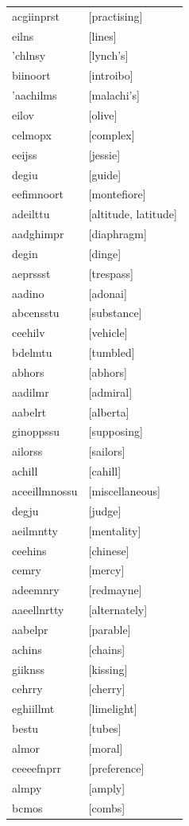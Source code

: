 \documentclass{article}
\begin{document}
\begin{tabular}{ll}
acgiinprst & [practising] \\
eilns & [lines] \\
'chlnsy & [lynch's] \\
biinoort & [introibo] \\
'aachilms & [malachi's] \\
eilov & [olive] \\
celmopx & [complex] \\
eeijss & [jessie] \\
degiu & [guide] \\
eefimnoort & [montefiore] \\
adeilttu & [altitude, latitude] \\
aadghimpr & [diaphragm] \\
degin & [dinge] \\
aeprssst & [trespass] \\
aadino & [adonai] \\
abcensstu & [substance] \\
ceehilv & [vehicle] \\
bdelmtu & [tumbled] \\
abhors & [abhors] \\
aadilmr & [admiral] \\
aabelrt & [alberta] \\
ginoppssu & [supposing] \\
ailorss & [sailors] \\
achill & [cahill] \\
aceeillmnossu & [miscellaneous] \\
degju & [judge] \\
aeilmntty & [mentality] \\
ceehins & [chinese] \\
cemry & [mercy] \\
adeemnry & [redmayne] \\
aaeellnrtty & [alternately] \\
aabelpr & [parable] \\
achins & [chains] \\
giiknss & [kissing] \\
cehrry & [cherry] \\
eghiillmt & [limelight] \\
bestu & [tubes] \\
almor & [moral] \\
ceeeefnprr & [preference] \\
almpy & [amply] \\
bcmos & [combs] \\

\end{tabular}
\end{document}
